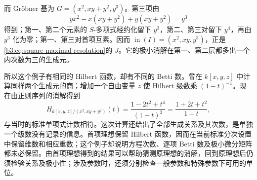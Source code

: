 \ProseParagraphBreak
而 Gröbner 基为 \(G=(x^2,xy+y^2,y^3)\)。第三项由
\[
	y x^2-x(xy+y^2)+y(xy+y^2)=y^3
\]
得到；第一、第二个元素的 \(S\)-多项式经约化留下 \(y^3\)，第二、第三对留下 \(y^4\)，再由 \(y^3\) 化为零；第一、第三对首项互素。因而 \(\operatorname{in}(I)=(x^2,xy,y^3)\)，正是\eqref{b3:eq:square-maximal-resolution}的 \(J\)。它的极小消解在第一、第二层都多出一个内次数为三的生成元。

\ProseParagraphBreak
所以这个例子有相同的 Hilbert 函数，却有不同的 Betti 数。曾在 \(k[x,y,z]\) 中计算同样两个生成元的商；增加一个自由变量 \(z\) 使 Hilbert 级数乘 \((1-t)^{-1}\)。现在由正则序列的消解得到
\[
	H_{k[x,y,z]/(x^2,xy+y^2)}(t) =\frac{1-2t^2+t^4}{(1-t)^3} =\frac{1+2t+t^2}{1-t},
\]
与当时的标准单项式计数相符。这次计算还给出了全部生成关系及其次数，是单独一个级数没有记录的信息。首项理想保留 Hilbert 函数，因而在当前标准分次设置中保留维数和相应重数；这个例子却说明方程次数、逐项 Betti 数及极小微分矩阵都未必保留。由首项理想得到的结果可以帮助猜测原理想的消解，回到原理想后仍须检验关系及极小性；涉及参数时，还须分别检查一般参数和特殊参数下可用的单位。

